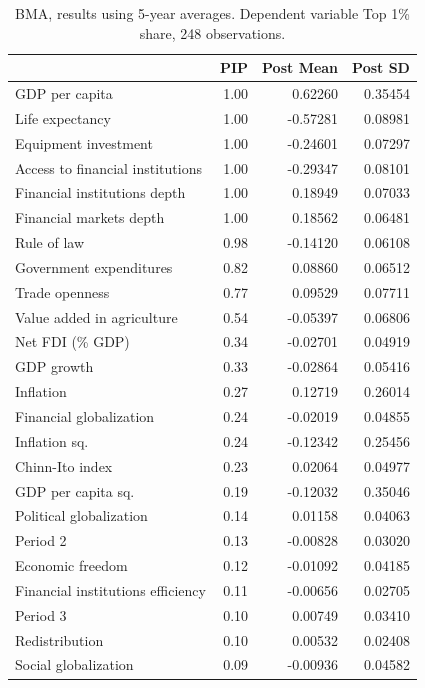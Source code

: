 \documentclass[preprint, nonatbib, 10pt]{elsarticle}
\begin{document}
    \begin{table}[ht!]
      \centering
      \small
      \caption{BMA, results using 5-year averages. Dependent variable Top 1\% share, 248 observations.}\label{res:5y_top1}
      \begin{tabular}{lrrr}
        \toprule
       & PIP & Post Mean & Post SD \\
        \midrule
        GDP per capita & 1.00 & 0.62260 & 0.35454 \\
  Life expectancy & 1.00 & -0.57281 & 0.08981 \\ 
  Equipment investment & 1.00 & -0.24601 & 0.07297 \\ 
  Access to financial institutions & 1.00 & -0.29347 & 0.08101 \\ 
  Financial institutions depth & 1.00 & 0.18949 & 0.07033 \\
  Financial markets depth & 1.00 & 0.18562 & 0.06481 \\ 
  Rule of law & 0.98 & -0.14120 & 0.06108 \\ 
  Government expenditures & 0.82 & 0.08860 & 0.06512 \\ 
  Trade openness & 0.77 & 0.09529 & 0.07711 \\ 
  Value added in agriculture & 0.54 & -0.05397 & 0.06806 \\
  Net FDI (\% GDP) & 0.34 & -0.02701 & 0.04919 \\ 
  GDP growth & 0.33 & -0.02864 & 0.05416 \\ 
  Inflation & 0.27 & 0.12719 & 0.26014 \\ 
  Financial globalization & 0.24 & -0.02019 & 0.04855 \\
  Inflation sq. & 0.24 & -0.12342 & 0.25456 \\
  Chinn-Ito index & 0.23 & 0.02064 & 0.04977 \\
  GDP per capita sq. & 0.19 & -0.12032 & 0.35046 \\ 
  Political globalization & 0.14 & 0.01158 & 0.04063 \\
  Period 2 & 0.13 & -0.00828 & 0.03020 \\
  Economic freedom & 0.12 & -0.01092 & 0.04185 \\ 
  Financial institutions efficiency & 0.11 & -0.00656 & 0.02705 \\
  Period 3 & 0.10 & 0.00749 & 0.03410 \\
  Redistribution & 0.10 & 0.00532 & 0.02408 \\
  Social globalization & 0.09 & -0.00936 & 0.04582 \\

\end{tabular}
\end{table}
\end{document}
